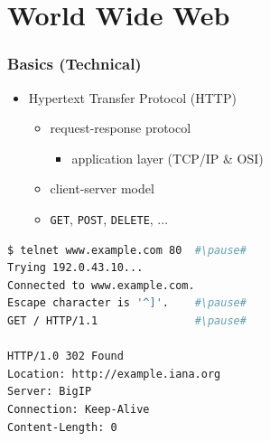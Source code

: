 \documentclass{beamer}
\begin{document}
\section{World Wide Web} 
\begin{frame}[fragile]\frametitle{Basics (Technical)} 
  \begin{itemize}
    \item Hypertext Transfer Protocol (HTTP)
    \begin{itemize}
      \item request-response protocol
      \begin{itemize}
        \item application layer (TCP/IP \& OSI)
      \end{itemize}
      \item client-server model
      \item \texttt{GET}, \texttt{POST}, \texttt{DELETE}, ...
    \end{itemize}
  \end{itemize}
  
  \begin{lstlisting}[language=bash, escapechar={\#}]
$ telnet www.example.com 80  #\pause#
Trying 192.0.43.10...
Connected to www.example.com.
Escape character is '^]'.    #\pause#
GET / HTTP/1.1               #\pause#

HTTP/1.0 302 Found
Location: http://example.iana.org
Server: BigIP
Connection: Keep-Alive
Content-Length: 0
  \end{lstlisting}

\end{frame}
\end{document}
